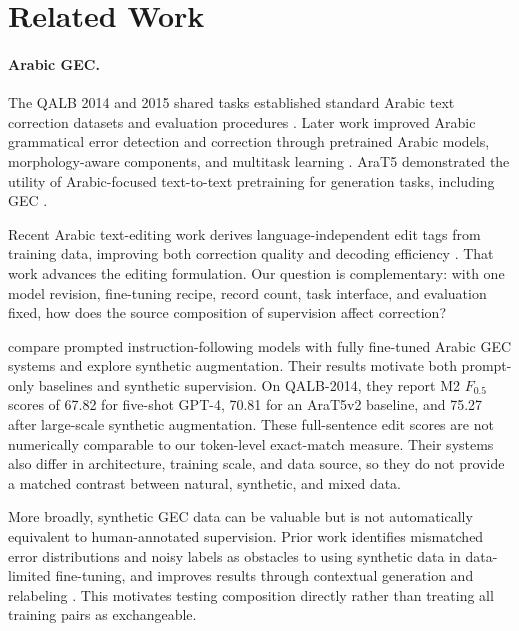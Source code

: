 \documentclass[11pt,a4paper]{article}
\begin{document}
\section{Related Work}

\paragraph{Arabic GEC.}
The QALB 2014 and 2015 shared tasks established standard Arabic text
correction datasets and evaluation procedures
\citep{mohit-etal-2014-first,rozovskaya-etal-2015-second}.  Later work improved
Arabic grammatical error detection and correction through pretrained Arabic
models, morphology-aware components, and multitask learning
\citep{alhafni-etal-2023-advancements}.  AraT5 demonstrated the utility of
Arabic-focused text-to-text pretraining for generation tasks, including GEC
\citep{nagoudi-etal-2022-arat5}.

Recent Arabic text-editing work derives language-independent edit tags from
training data, improving both correction quality and decoding efficiency
\citep{alhafni-habash-2025-enhancing}.  That work advances the editing
formulation.  Our question is complementary: with one model revision,
fine-tuning recipe, record count, task interface, and evaluation fixed, how
does the source composition of supervision affect correction?

\citet{kwon-etal-2023-beyond} compare prompted instruction-following models
with fully fine-tuned Arabic GEC systems and explore synthetic augmentation.
Their results motivate both prompt-only baselines and synthetic supervision.
On QALB-2014, they report M2 $F_{0.5}$ scores of 67.82 for five-shot GPT-4,
70.81 for an AraT5v2 baseline, and 75.27 after large-scale synthetic
augmentation.  These full-sentence edit scores are not numerically comparable
to our token-level exact-match measure.  Their systems also differ in
architecture, training scale, and data source, so they do not provide a
matched contrast between natural, synthetic, and mixed data.

More broadly, synthetic GEC data can be valuable but is not automatically
equivalent to human-annotated supervision.  Prior work identifies mismatched
error distributions and noisy labels as obstacles to using synthetic data in
data-limited fine-tuning, and improves results through contextual generation
and relabeling \citep{wang-etal-2024-improving-grammatical}.  This motivates
testing composition directly rather than treating all training pairs as
exchangeable.
\end{document}
